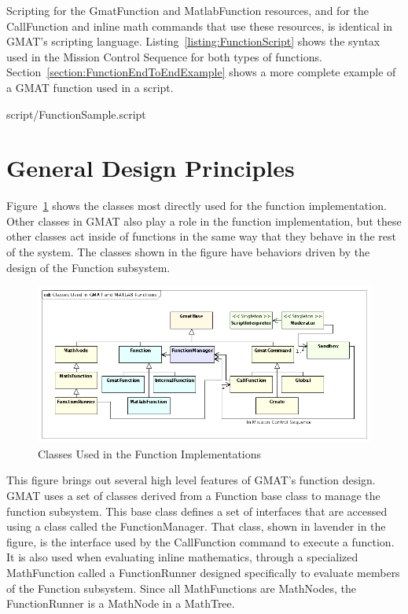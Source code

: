 Scripting for the GmatFunction and MatlabFunction resources, and for the CallFunction and inline
math commands that use these resources, is identical in GMAT's scripting language.
Listing~\ref{listing:FunctionScript} shows the syntax used in the Mission Control Sequence for both
types of functions.  Section~\ref{section:FunctionEndToEndExample} shows a more complete example of
a GMAT function used in a script.

\lstset{numbers=left}

{script/FunctionSample.script}
\lstset{numbers=none}

\section{General Design Principles}

Figure~\ref{figure:ClassesUsedInFunctions} shows the classes most directly used for the function
implementation.  Other classes in GMAT also play a role in the function implementation, but these
other classes act inside of functions in the same way that they behave in the rest of the system. 
The classes shown in the figure have behaviors driven by the design of the Function subsystem.

\begin{figure}[htb]
\begin{center}
\includegraphics[390,183]{Images/ClassesUsedinGMATandMATLABFunctions.png}
\caption{\label{figure:ClassesUsedInFunctions}Classes Used in the Function Implementations}
\end{center}
\end{figure}

This figure brings out several high level features of GMAT's function design.  GMAT uses a set of
classes derived from a Function base class to manage the function subsystem.  This base class
defines a set of interfaces that are accessed using a class called the FunctionManager.  That
class, shown in lavender in the figure, is the interface used by the CallFunction command to
execute a function.  It is also used when evaluating inline mathematics, through a specialized
MathFunction called a FunctionRunner designed specifically to evaluate members of the Function
subsystem.  Since all MathFunctions are MathNodes, the FunctionRunner is a MathNode in a MathTree.

